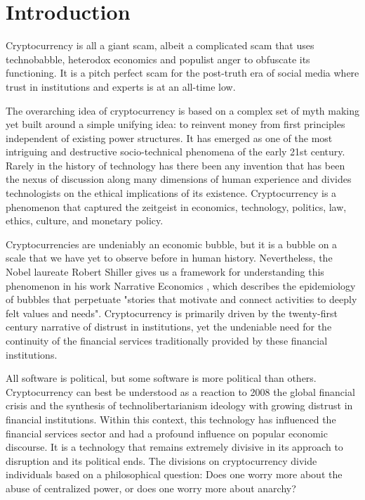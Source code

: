 \chapter{Introduction}

Cryptocurrency is all a giant scam, albeit a complicated scam that uses
technobabble, heterodox economics and populist anger to obfuscate its
functioning. It is a pitch perfect scam for the post-truth era of social media
where trust in institutions and experts is at an all-time low.

The overarching idea of cryptocurrency is based on a complex set of myth making
yet built around a simple unifying idea: to reinvent money from first principles
independent of existing power structures. It has emerged as one of the most
intriguing and destructive socio-technical phenomena of the early 21st century.
Rarely in the history of technology has there been any invention that has been
the nexus of discussion along many dimensions of human experience and divides
technologists on the ethical implications of its existence. Cryptocurrency is a
phenomenon that captured the zeitgeist in economics, technology, politics, law,
ethics, culture, and monetary policy.

Cryptocurrencies are undeniably an economic bubble, but it is a bubble on a
scale that we have yet to observe before in human history. Nevertheless, the
Nobel laureate Robert Shiller gives us a framework for understanding this
phenomenon in his work Narrative Economics \cite{shiller_narrative_2017}, which
describes the epidemiology of bubbles that perpetuate "stories that motivate and
connect activities to deeply felt values and needs". Cryptocurrency is primarily
driven by the twenty-first century narrative of distrust in institutions, yet
the undeniable need for the continuity of the financial services traditionally
provided by these financial institutions.

All software is political, but some software is more political than others.
Cryptocurrency can best be understood as a reaction to 2008 the global financial
crisis and the synthesis of technolibertarianism ideology with growing distrust
in financial institutions. Within this context, this technology has influenced
the financial services sector and had a profound influence on popular economic
discourse. It is a technology that remains extremely divisive in its approach to
disruption and its political ends. The divisions on cryptocurrency divide
individuals based on a philosophical question: Does one worry more about the
abuse of centralized power, or does one worry more about anarchy?

